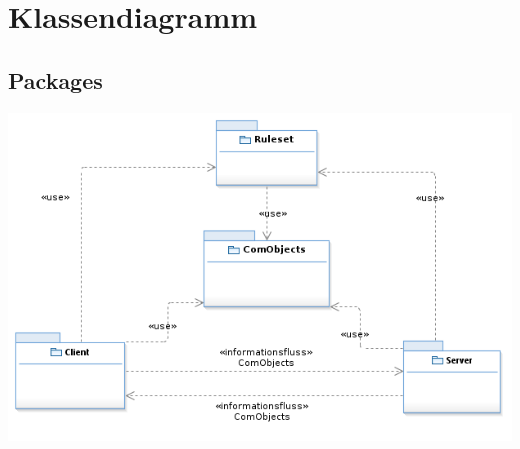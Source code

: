 \documentclass{article}
\begin{document}
\section{Klassendiagramm}

\subsection{Packages}
\includegraphics[width=\textwidth]{Packages}
\end{document}
